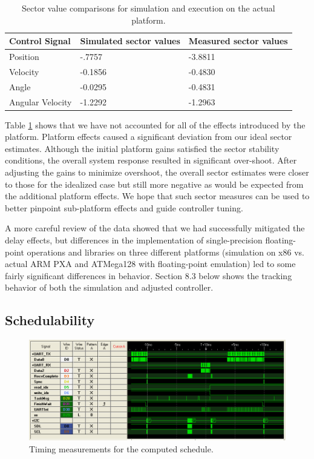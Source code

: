 \begin{table}[ht]
\centering

\begin{tabular}[width=\columnwidth]{ | l | l | l | }

\hline
\textbf{Control Signal} & \textbf{Simulated sector values} & \textbf{Measured sector values} \\
\hline \hline
Position & -.7757 & -3.8811 \\
\hline
Velocity & -0.1856 & -0.4830 \\
\hline
Angle & -0.0295 & -0.4831 \\
\hline
Angular Velocity & -1.2292 & -1.2963 \\
\hline
\end{tabular}
\caption{ Sector value comparisons for simulation and execution on the actual platform.}
\label{tab:sectors}
\end{table}

Table \ref{tab:sectors} shows that we have not accounted for all of the effects 
introduced by the platform. Platform effects caused a significant deviation from 
our ideal sector estimates.  
Although the initial platform gains satisfied the sector stability conditions,
the overall system response resulted in significant over-shoot.  After adjusting 
the gains to minimize overshoot, the overall sector estimates were closer
to those for the idealized case but still more negative as would be expected from 
the additional platform effects.  We hope that such sector measures can
be used to better pinpoint sub-platform effects and guide controller tuning.

A more careful review of the data showed that we had
successfully mitigated the delay effects, but differences in the implementation of
single-precision floating-point operations and libraries on three different platforms 
(simulation on x86 vs. actual ARM PXA and ATMega128 with floating-point emulation)
led to some fairly significant differences in behavior.  Section 8.3
below shows the tracking behavior of both the simulation and adjusted controller.

\subsection{Schedulability}

\begin{figure}
\includegraphics[width=\columnwidth]{figures/probe.png}
    \caption{Timing measurements for the computed schedule. }
    \label{fig:timing}
\end{figure}

